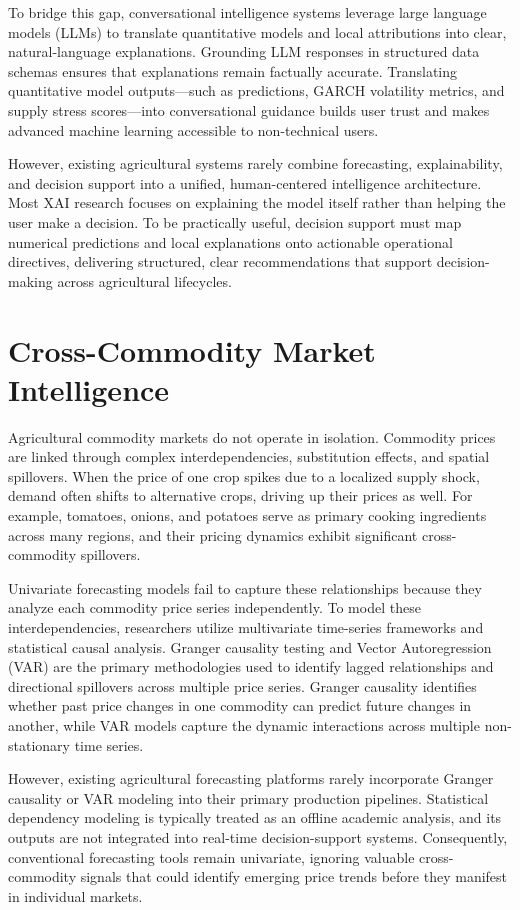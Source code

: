 \documentclass[12pt,a4paper]{report}
\theoremstyle{definition}
\theoremstyle{remark}
\begin{document}
To bridge this gap, conversational intelligence systems leverage large language models (LLMs) to translate quantitative models and local attributions into clear, natural-language explanations. Grounding LLM responses in structured data schemas ensures that explanations remain factually accurate. Translating quantitative model outputs—such as predictions, GARCH volatility metrics, and supply stress scores—into conversational guidance builds user trust and makes advanced machine learning accessible to non-technical users.

However, existing agricultural systems rarely combine forecasting, explainability, and decision support into a unified, human-centered intelligence architecture. Most XAI research focuses on explaining the model itself rather than helping the user make a decision. To be practically useful, decision support must map numerical predictions and local explanations onto actionable operational directives, delivering structured, clear recommendations that support decision-making across agricultural lifecycles.

\section{Cross-Commodity Market Intelligence}

Agricultural commodity markets do not operate in isolation. Commodity prices are linked through complex interdependencies, substitution effects, and spatial spillovers. When the price of one crop spikes due to a localized supply shock, demand often shifts to alternative crops, driving up their prices as well. For example, tomatoes, onions, and potatoes serve as primary cooking ingredients across many regions, and their pricing dynamics exhibit significant cross-commodity spillovers.

Univariate forecasting models fail to capture these relationships because they analyze each commodity price series independently. To model these interdependencies, researchers utilize multivariate time-series frameworks and statistical causal analysis. Granger causality testing and Vector Autoregression (VAR) are the primary methodologies used to identify lagged relationships and directional spillovers across multiple price series. Granger causality identifies whether past price changes in one commodity can predict future changes in another, while VAR models capture the dynamic interactions across multiple non-stationary time series.

However, existing agricultural forecasting platforms rarely incorporate Granger causality or VAR modeling into their primary production pipelines. Statistical dependency modeling is typically treated as an offline academic analysis, and its outputs are not integrated into real-time decision-support systems. Consequently, conventional forecasting tools remain univariate, ignoring valuable cross-commodity signals that could identify emerging price trends before they manifest in individual markets.
\end{document}
